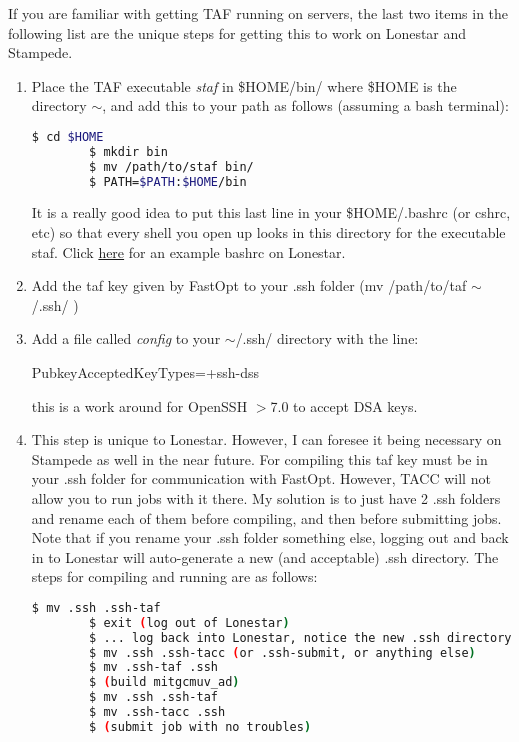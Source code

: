 \documentclass[a4paper,11pt]{article}
\begin{document}
	If you are familiar with getting TAF running on servers, the last two items in the following list are the unique steps for getting this to work on Lonestar and Stampede.

	\begin{enumerate}
	  \item Place the TAF executable \textit{staf} in \$HOME/bin/ where \$HOME is the directory $\sim$, and add this to your path as follows (assuming a bash terminal): 

	  \begin{lstlisting}[language=bash]
		$ cd $HOME
		$ mkdir bin
		$ mv /path/to/staf bin/
	 	$ PATH=$PATH:$HOME/bin
	  \end{lstlisting}

	It is a really good idea to put this last line in your \$HOME/.bashrc (or cshrc, etc) so that every shell you open up looks in this directory for the executable staf. Click \href{http://users.ices.utexas.edu/~tsmith/bash-scripts/bashrc_tsmith_lonestar}{here} for an example bashrc on Lonestar.

	\item Add the taf key given by FastOpt to your .ssh folder (mv /path/to/taf $\sim$/.ssh/ )

	\item Add a file called \textit{config} to your $\sim$/.ssh/ directory with the line:

	PubkeyAcceptedKeyTypes=+ssh-dss

	this is a work around for OpenSSH $>$7.0 to accept DSA keys.
	
	\item This step is unique to Lonestar. However, I can foresee it being necessary on Stampede as well in the near future. For compiling this taf key must be in your .ssh folder for communication with FastOpt. However, TACC will not allow you to run jobs with it there. My solution is to just have 2 .ssh folders and rename each of them before compiling, and then before submitting jobs. Note that if you rename your .ssh folder something else, logging out and back in to Lonestar will auto-generate a new (and acceptable) .ssh directory. The steps for compiling and running are as follows:  

	  \begin{lstlisting}[language=bash]
		$ mv .ssh .ssh-taf
		$ exit (log out of Lonestar) 
		$ ... log back into Lonestar, notice the new .ssh directory
		$ mv .ssh .ssh-tacc (or .ssh-submit, or anything else) 
		$ mv .ssh-taf .ssh
		$ (build mitgcmuv_ad) 
		$ mv .ssh .ssh-taf 
		$ mv .ssh-tacc .ssh
		$ (submit job with no troubles) 

	  \end{lstlisting} 

	\end{enumerate}
	
\end{document}
